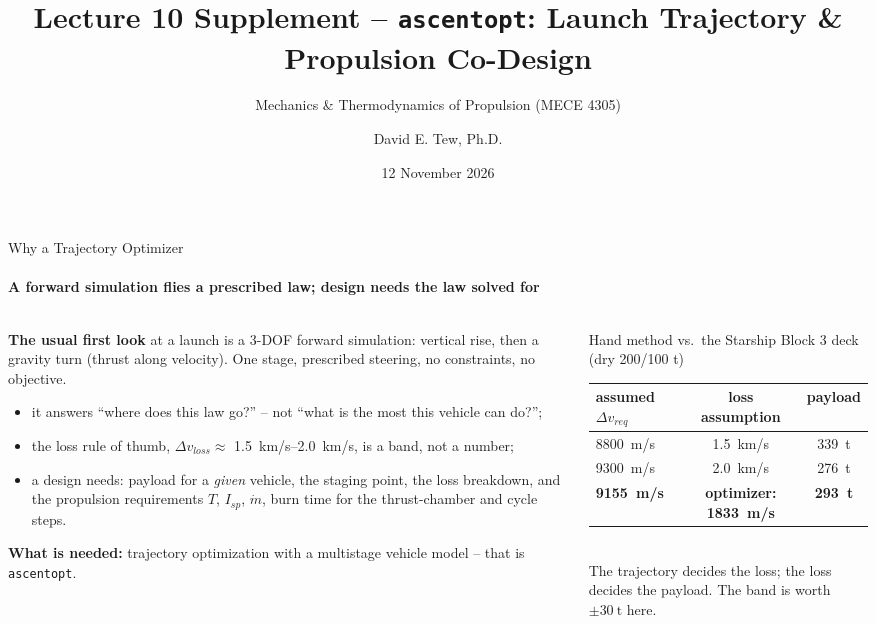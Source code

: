 \documentclass[aspectratio=169,10pt]{beamer}
\title[Lecture 10 -- Trajectory Tool]{Lecture 10 Supplement -- \texttt{ascentopt}: Launch Trajectory \& Propulsion Co-Design}
\subtitle{Mechanics \& Thermodynamics of Propulsion (MECE 4305)}
\author{David E. Tew, Ph.D.}
\institute[Columbia]{Columbia University \quad\textbullet\quad david.tew@columbia.edu}
\date{12 November 2026}
\providecommand{\Isp}{{I_{sp}}}\providecommand{\cstar}{{c^{*}}}\providecommand{\CF}{{C_F}}\providecommand{\mdot}{\dot m}
\providecommand{\dv}{\Delta v}\providecommand{\gz}{g_0}\providecommand{\pc}{p_c}\providecommand{\dd}{\mathrm{d}}\providecommand{\eps}{\varepsilon}
\newcommand{\tool}{\texttt{ascentopt}}
\begin{document}
\begin{frame}
  \titlepage
\end{frame}

\begin{frame}{Why a Trajectory Optimizer}
  \framesubtitle{A forward simulation flies a prescribed law; design needs the law solved for}
  \begin{columns}[T]
    \begin{column}{0.52\textwidth}
      \textbf{The usual first look} at a launch is a 3-DOF forward simulation: vertical rise, then a gravity turn (thrust along velocity). One stage, prescribed steering, no constraints, no objective.
      \begin{itemize}
        \item it answers ``where does this law go?'' -- not ``what is the most this vehicle can do?'';
        \item the loss rule of thumb, $\dv_{loss}\approx$ \SIrange{1.5}{2.0}{km/s}, is a band, not a number;
        \item a design needs: payload for a \emph{given} vehicle, the staging point, the loss breakdown, and the propulsion requirements $T$, $\Isp$, $\mdot$, burn time for the thrust-chamber and cycle steps.
      \end{itemize}
      \vspace{3pt}
      \textbf{What is needed:} trajectory optimization with a multistage vehicle model -- that is \tool.
    \end{column}
    \begin{column}{0.46\textwidth}
      \begin{block}{Hand method vs.\ the Starship Block 3 deck (dry 200/100 t)}
        \scriptsize
        \begin{tabular}{lcc}
          \toprule
          assumed $\dv_{req}$ & loss assumption & payload \\
          \midrule
          \SI{8800}{m/s} & \SI{1.5}{km/s} & \SI{339}{\tonne} \\
          \SI{9300}{m/s} & \SI{2.0}{km/s} & \SI{276}{\tonne} \\
          \rowcolor{PMS284C!25} \textbf{\SI{9155}{m/s}} & \textbf{optimizer: \SI{1833}{m/s}} & \textbf{\SI{293}{\tonne}} \\
          \bottomrule
        \end{tabular}\\[3pt]
        The trajectory decides the loss; the loss decides the payload. The band is worth $\pm\SI{30}{\tonne}$ here.
      \end{block}
    \end{column}
  \end{columns}
\end{frame}
\end{document}
